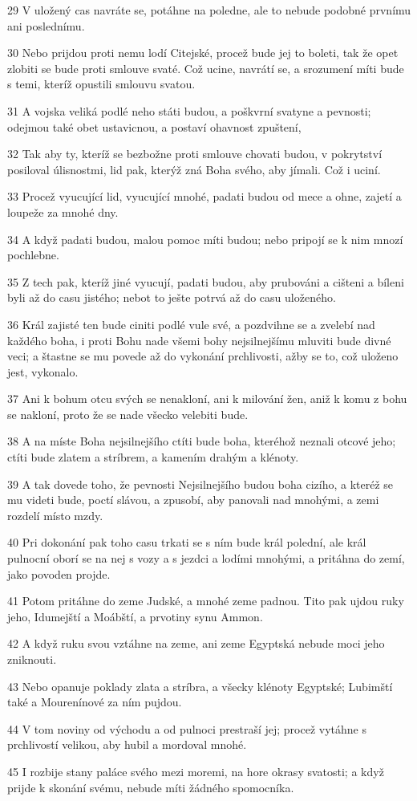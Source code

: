 \par 29 V uložený cas navráte se, potáhne na poledne, ale to nebude podobné prvnímu ani poslednímu.
\par 30 Nebo prijdou proti nemu lodí Citejské, procež bude jej to boleti, tak že opet zlobiti se bude proti smlouve svaté. Což ucine, navrátí se, a srozumení míti bude s temi, kteríž opustili smlouvu svatou.
\par 31 A vojska veliká podlé neho státi budou, a poškvrní svatyne a pevnosti; odejmou také obet ustavicnou, a postaví ohavnost zpuštení,
\par 32 Tak aby ty, kteríž se bezbožne proti smlouve chovati budou, v pokrytství posiloval úlisnostmi, lid pak, kterýž zná Boha svého, aby jímali. Což i uciní.
\par 33 Procež vyucující lid, vyucující mnohé, padati budou od mece a ohne, zajetí a loupeže za mnohé dny.
\par 34 A když padati budou, malou pomoc míti budou; nebo pripojí se k nim mnozí pochlebne.
\par 35 Z tech pak, kteríž jiné vyucují, padati budou, aby prubováni a cišteni a bíleni byli až do casu jistého; nebot to ješte potrvá až do casu uloženého.
\par 36 Král zajisté ten bude ciniti podlé vule své, a pozdvihne se a zvelebí nad každého boha, i proti Bohu nade všemi bohy nejsilnejšímu mluviti bude divné veci; a štastne se mu povede až do vykonání prchlivosti, ažby se to, což uloženo jest, vykonalo.
\par 37 Ani k bohum otcu svých se nenakloní, ani k milování žen, aniž k komu z bohu se nakloní, proto že se nade všecko velebiti bude.
\par 38 A na míste Boha nejsilnejšího ctíti bude boha, kteréhož neznali otcové jeho; ctíti bude zlatem a stríbrem, a kamením drahým a klénoty.
\par 39 A tak dovede toho, že pevnosti Nejsilnejšího budou boha cizího, a kteréž se mu videti bude, poctí slávou, a zpusobí, aby panovali nad mnohými, a zemi rozdelí místo mzdy.
\par 40 Pri dokonání pak toho casu trkati se s ním bude král polední, ale král pulnocní oborí se na nej s vozy a s jezdci a lodími mnohými, a pritáhna do zemí, jako povoden projde.
\par 41 Potom pritáhne do zeme Judské, a mnohé zeme padnou. Tito pak ujdou ruky jeho, Idumejští a Moábští, a prvotiny synu Ammon.
\par 42 A když ruku svou vztáhne na zeme, ani zeme Egyptská nebude moci jeho zniknouti.
\par 43 Nebo opanuje poklady zlata a stríbra, a všecky klénoty Egyptské; Lubimští také a Mourenínové za ním pujdou.
\par 44 V tom noviny od východu a od pulnoci prestraší jej; procež vytáhne s prchlivostí velikou, aby hubil a mordoval mnohé.
\par 45 I rozbije stany paláce svého mezi moremi, na hore okrasy svatosti; a když prijde k skonání svému, nebude míti žádného spomocníka.

